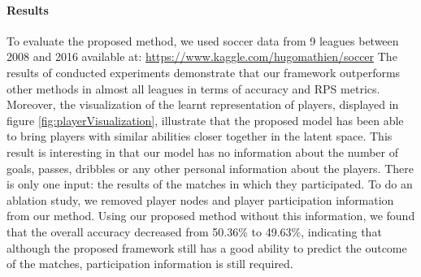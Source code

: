 \documentclass{article}
\begin{document}
\paragraph{Results} To evaluate the proposed method, we used soccer data from 9 leagues between 2008 and 2016 available at: \url{https://www.kaggle.com/hugomathien/soccer} 
The results of conducted experiments demonstrate that our framework outperforms other methods in almost all leagues in terms of accuracy and RPS metrics. Moreover, the visualization of the learnt representation of players, displayed in figure \ref{fig:playerVisualization}, illustrate that the proposed model has been able to bring players with similar abilities closer together in the latent space. This result is interesting in that our model has no information about the number of goals, passes, dribbles or any other personal information about the players. There is only one input: the results of the matches in which they participated.
To do an ablation study, we removed player nodes and player participation information from our method. 
Using our proposed method without this information, we found that the overall accuracy decreased from 50.36\% to 49.63\%, indicating that although the proposed framework still has a good ability to predict the outcome of the matches, participation information is still required.
\end{document}
